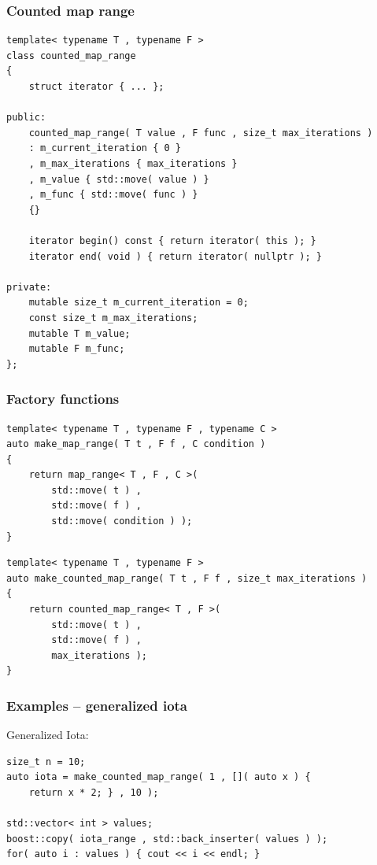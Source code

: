 \documentclass{beamer}
\newcommand{\heading}[1]{\frametitle{#1}}
\begin{document}
\begin{frame}[fragile]
  \heading{Counted map range}
  
\begin{lstlisting}[basicstyle=\scriptsize\ttfamily]
template< typename T , typename F >
class counted_map_range
{
    struct iterator { ... };
    
public:
    counted_map_range( T value , F func , size_t max_iterations )
    : m_current_iteration { 0 }
    , m_max_iterations { max_iterations }
    , m_value { std::move( value ) }
    , m_func { std::move( func ) }
    {}
    
    iterator begin() const { return iterator( this ); }
    iterator end( void ) { return iterator( nullptr ); }
    
private:
    mutable size_t m_current_iteration = 0;
    const size_t m_max_iterations;
    mutable T m_value;
    mutable F m_func;
};
\end{lstlisting}

\end{frame}


\begin{frame}[fragile]
 \heading{Factory functions}
 
\begin{lstlisting}[basicstyle=\scriptsize\ttfamily]
template< typename T , typename F , typename C >
auto make_map_range( T t , F f , C condition )
{
    return map_range< T , F , C >(
        std::move( t ) ,
        std::move( f ) ,
        std::move( condition ) );
}
\end{lstlisting}

\begin{lstlisting}[basicstyle=\scriptsize\ttfamily]
template< typename T , typename F >
auto make_counted_map_range( T t , F f , size_t max_iterations )
{
    return counted_map_range< T , F >(
        std::move( t ) ,
        std::move( f ) , 
        max_iterations );
}
\end{lstlisting}
 


\end{frame}



\begin{frame}[fragile]
 \heading{Examples -- generalized iota}
 
 Generalized Iota:
\begin{lstlisting}[basicstyle=\scriptsize\ttfamily]
size_t n = 10;
auto iota = make_counted_map_range( 1 , []( auto x ) {
    return x * 2; } , 10 );

std::vector< int > values;
boost::copy( iota_range , std::back_inserter( values ) );
for( auto i : values ) { cout << i << endl; }
\end{lstlisting}

\end{frame}
\end{document}

